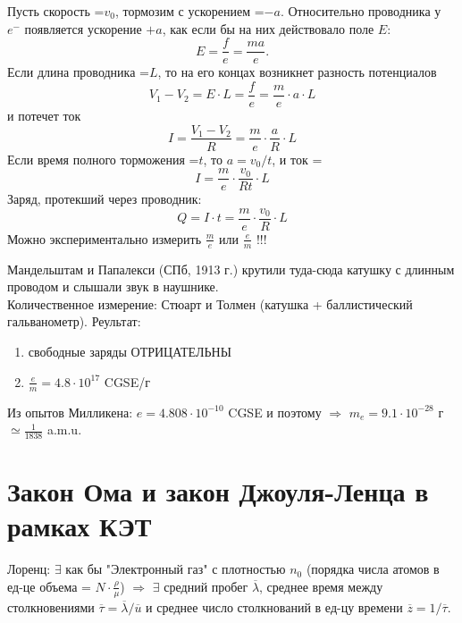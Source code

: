  Пусть скорость =$v_0$, тормозим с ускорением =$-a$. Относительно проводника у $e^-$ появляется ускорение $+a$, как если бы на них действовало поле $E$:
 \begin{displaymath}
 E=\frac{f}{e}=\frac{ma}{e}.
 \end{displaymath}
 Если длина проводника =$L$, то на его концах возникнет разность потенциалов
 \begin{displaymath}
 V_1-V_2=E\cdot L=\frac{f}{e}=\frac{m}{e}\cdot a\cdot L
 \end{displaymath}
 и потечет ток
 \begin{displaymath}
 I=\frac{V_1-V_2}{R}=\frac{m}{e}\cdot \frac{a}{R}\cdot L
 \end{displaymath}
Если время полного торможения =$t$, то $a=v_0/t$, и ток =
 \begin{displaymath}
 I=\frac{m}{e}\cdot \frac{v_0}{Rt}\cdot L
 \end{displaymath}
Заряд, протекший через проводник:\vspace{-3mm}
 \begin{displaymath}
 Q=I\cdot t=\frac{m}{e}\cdot \frac{v_0}{R}\cdot L
 \end{displaymath}
Можно экспериментально измерить $\frac{m}{e}$ или  $\frac{e}{m}$ !!!

Мандельштам и Папалекси (СПб, 1913 г.) крутили туда-сюда катушку с длинным проводом и слышали звук в наушнике.\\
Количественное измерение: Стюарт и Толмен (катушка + баллистический гальванометр). Реультат:
\begin{enumerate}
\item свободные заряды ОТРИЦАТЕЛЬНЫ
\item $\frac{e}{m}=4.8\cdot 10^{17}$ CGSE/г
\end{enumerate}
Из опытов Милликена: $e=4.808\cdot10^{-10}$ CGSE и поэтому  $\Rightarrow$ $m_e=9.1\cdot10^{-28}$ г $\simeq\frac1{1838}$ a.m.u.\\[3mm]

\section{Закон Ома и закон Джоуля-Ленца в рамках КЭТ}

Лоренц: $\exists$ как бы "Электронный газ" с плотностью $n_0$ (порядка числа атомов в ед-це объема = $N\cdot\frac{\rho}{\mu}$) $\Rightarrow$ $\exists$ средний пробег $\overline{\lambda}$, среднее время между столкновениями  $\overline{\tau}=\overline{\lambda}/\overline{u}$ и среднее число столкнований в ед-цу времени $\overline{z}=1/\overline{\tau}$.

